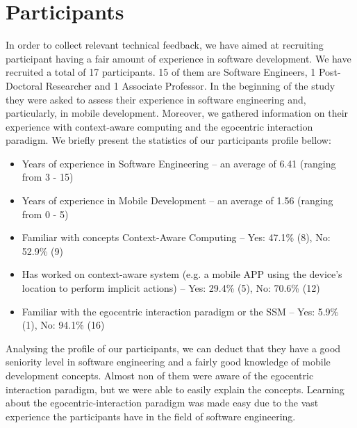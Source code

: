 \section{Participants} %
\label{sec:eval_participants}
In order to collect relevant technical feedback, we have aimed at recruiting participant having a fair amount of experience in software development. We have recruited a total of 17 participants. 15 of them are Software Engineers, 1 Post-Doctoral Researcher and 1 Associate Professor. In the beginning of the study they were asked to assess their experience in software engineering and, particularly, in mobile development. Moreover, we gathered information on their experience with context-aware computing and the egocentric interaction paradigm. We briefly present the statistics of our participants profile bellow:
\begin{itemize}
	\item Years of experience in Software Engineering -- an average of 6.41 (ranging from 3 - 15)
	\item Years of experience in Mobile Development -- an average of 1.56 (ranging from 0 - 5)
	\item Familiar with concepts Context-Aware Computing -- Yes: 47.1\% (8), No: 52.9\% (9)
	\item Has worked on context-aware system (e.g. a mobile APP using the device's location to perform implicit actions) -- Yes: 29.4\% (5), No: 70.6\% (12)
	\item Familiar with the egocentric interaction paradigm or the SSM -- Yes: 5.9\% (1), No: 94.1\% (16)
\end{itemize}

Analysing the profile of our participants, we can deduct that they have a good seniority level in software engineering and a fairly good knowledge of mobile development concepts. Almost non of them were aware of the egocentric interaction paradigm, but we were able to easily explain the concepts. Learning about the egocentric-interaction paradigm was made easy due to the vast experience the participants have in the field of software engineering.
